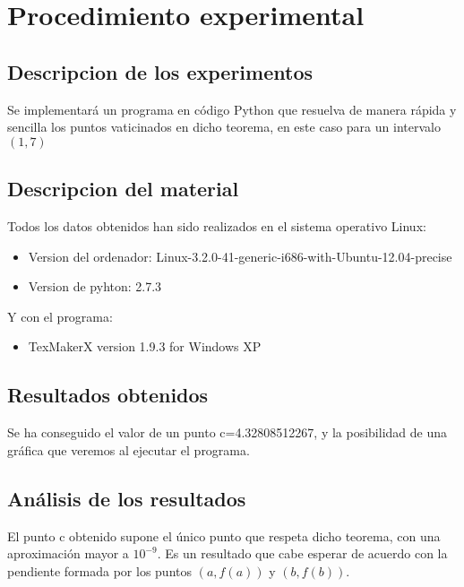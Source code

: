 \documentclass{beamer}
\begin{document}
  \section{Procedimiento experimental}
  
    
   \subsection{Descripcion de los experimentos}
      \begin{frame}
       Se implementará un programa en código Python que resuelva de manera rápida y sencilla los puntos vaticinados en dicho teorema, en este caso para un intervalo $ (1,7) $ 
   \end{frame}
  \subsection{Descripcion del material}
   \begin{frame}
    Todos los datos obtenidos han sido realizados en el sistema operativo Linux:
       \begin{itemize}
             \item Version del ordenador: Linux-3.2.0-41-generic-i686-with-Ubuntu-12.04-precise 
             \item Version de pyhton: 2.7.3
        \end{itemize}
     Y con el programa:
     \begin{itemize}
              \item TexMakerX version 1.9.3 for Windows XP
     \end{itemize}
   \end{frame}
  \subsection{Resultados obtenidos}
      \begin{frame}
            Se ha conseguido el valor de un punto c=4.32808512267, y la posibilidad de una gráfica que veremos al ejecutar el programa.
            
      \end{frame}
 \subsection{Análisis de los resultados}
   \begin{frame}
      El punto c obtenido supone el único punto que respeta dicho teorema, con una aproximación mayor a $ 10^{-9} $. Es un resultado que cabe esperar de acuerdo con la pendiente formada por los puntos $ (a,f(a))$ y $(b,f(b))$.
   \end{frame}
\end{document}
